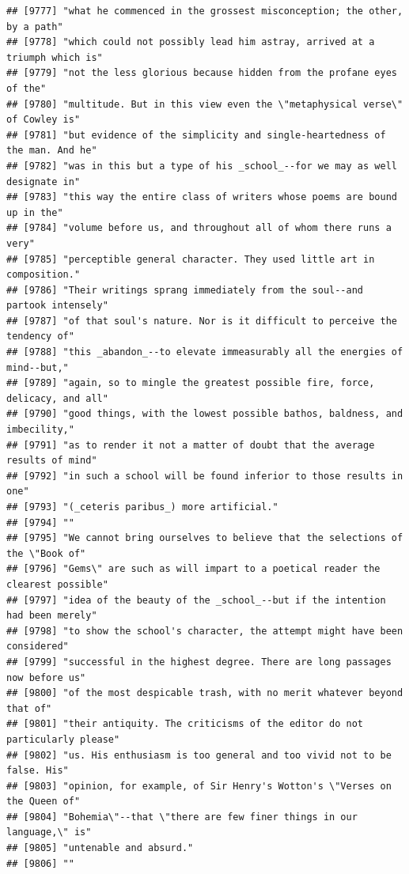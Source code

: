 \documentclass{article}\usepackage[]{graphicx}\usepackage[]{color}
\makeatletter
\newenvironment{kframe}{%
 \def\at@end@of@kframe{}%
 \ifinner\ifhmode%
  \def\at@end@of@kframe{\end{minipage}}%
  \begin{minipage}{\columnwidth}%
 \fi\fi%
 \def\FrameCommand##1{\hskip\@totalleftmargin \hskip-\fboxsep
 \colorbox{shadecolor}{##1}\hskip-\fboxsep
     \hskip-\linewidth \hskip-\@totalleftmargin \hskip\columnwidth}%
 \MakeFramed {\advance\hsize-\width
   \@totalleftmargin\z@ \linewidth\hsize
   \@setminipage}}%
 {\par\unskip\endMakeFramed%
 \at@end@of@kframe}
\newenvironment{knitrout}{}{} %
\makeatother
\begin{document}
\begin{knitrout}
\begin{kframe}
\begin{verbatim}
## [9777] "what he commenced in the grossest misconception; the other, by a path"       
## [9778] "which could not possibly lead him astray, arrived at a triumph which is"     
## [9779] "not the less glorious because hidden from the profane eyes of the"           
## [9780] "multitude. But in this view even the \"metaphysical verse\" of Cowley is"    
## [9781] "but evidence of the simplicity and single-heartedness of the man. And he"    
## [9782] "was in this but a type of his _school_--for we may as well designate in"     
## [9783] "this way the entire class of writers whose poems are bound up in the"        
## [9784] "volume before us, and throughout all of whom there runs a very"              
## [9785] "perceptible general character. They used little art in composition."         
## [9786] "Their writings sprang immediately from the soul--and partook intensely"      
## [9787] "of that soul's nature. Nor is it difficult to perceive the tendency of"      
## [9788] "this _abandon_--to elevate immeasurably all the energies of mind--but,"      
## [9789] "again, so to mingle the greatest possible fire, force, delicacy, and all"    
## [9790] "good things, with the lowest possible bathos, baldness, and imbecility,"     
## [9791] "as to render it not a matter of doubt that the average results of mind"      
## [9792] "in such a school will be found inferior to those results in one"             
## [9793] "(_ceteris paribus_) more artificial."                                        
## [9794] ""                                                                            
## [9795] "We cannot bring ourselves to believe that the selections of the \"Book of"   
## [9796] "Gems\" are such as will impart to a poetical reader the clearest possible"   
## [9797] "idea of the beauty of the _school_--but if the intention had been merely"    
## [9798] "to show the school's character, the attempt might have been considered"      
## [9799] "successful in the highest degree. There are long passages now before us"     
## [9800] "of the most despicable trash, with no merit whatever beyond that of"         
## [9801] "their antiquity. The criticisms of the editor do not particularly please"    
## [9802] "us. His enthusiasm is too general and too vivid not to be false. His"        
## [9803] "opinion, for example, of Sir Henry's Wotton's \"Verses on the Queen of"      
## [9804] "Bohemia\"--that \"there are few finer things in our language,\" is"          
## [9805] "untenable and absurd."                                                       
## [9806] ""                                                                            

\end{verbatim}
\end{kframe}
\end{knitrout}
\end{document}
